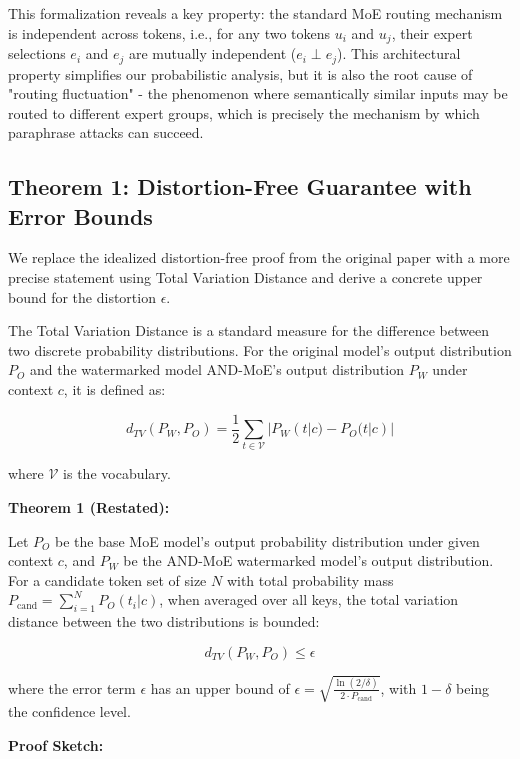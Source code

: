 \documentclass[letterpaper,twocolumn,10pt]{article}
\begin{document}
This formalization reveals a key property: the standard MoE routing mechanism is independent across tokens, i.e., for any two tokens $u_i$ and $u_j$, their expert selections $e_i$ and $e_j$ are mutually independent ($e_i \perp e_j$). This architectural property simplifies our probabilistic analysis, but it is also the root cause of "routing fluctuation" - the phenomenon where semantically similar inputs may be routed to different expert groups, which is precisely the mechanism by which paraphrase attacks can succeed.

\subsection{Theorem 1: Distortion-Free Guarantee with Error Bounds}

We replace the idealized distortion-free proof from the original paper with a more precise statement using Total Variation Distance and derive a concrete upper bound for the distortion $\epsilon$.

The Total Variation Distance is a standard measure for the difference between two discrete probability distributions. For the original model's output distribution $P_O$ and the watermarked model AND-MoE's output distribution $P_W$ under context $c$, it is defined as:

\begin{equation}
d_{TV}(P_W, P_O) = \frac{1}{2} \sum_{t \in \mathcal{V}} |P_W(t|c) - P_O(t|c)|
\end{equation}

where $\mathcal{V}$ is the vocabulary.

\textbf{Theorem 1 (Restated):}

Let $P_O$ be the base MoE model's output probability distribution under given context $c$, and $P_W$ be the AND-MoE watermarked model's output distribution. For a candidate token set of size $N$ with total probability mass $P_{\text{cand}} = \sum_{i=1}^N P_O(t_i|c)$, when averaged over all keys, the total variation distance between the two distributions is bounded:

\begin{equation}
d_{TV}(P_W, P_O) \le \epsilon
\end{equation}

where the error term $\epsilon$ has an upper bound of $\epsilon = \sqrt{\frac{\ln(2/\delta)}{2 \cdot P_{\text{cand}}}}$, with $1-\delta$ being the confidence level.

\textbf{Proof Sketch:}
\end{document}
